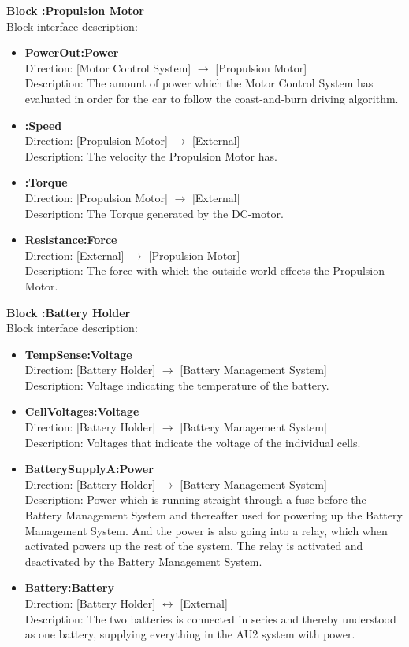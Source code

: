 \textbf{Block :Propulsion Motor}\\
Block interface description:
\begin{itemize}
	\item \textbf{PowerOut:Power}\\
	Direction: [Motor Control System] $\rightarrow$ [Propulsion Motor]\\
	Description: The amount of power which the Motor Control System has evaluated in order for the car to follow the coast-and-burn driving algorithm.
	\item \textbf{:Speed}\\
	Direction: [Propulsion Motor] $\rightarrow$ [External]\\
	Description: The velocity the Propulsion Motor has.
	\item \textbf{:Torque}\\
	Direction: [Propulsion Motor] $\rightarrow$ [External]\\
	Description: The Torque generated by the DC-motor. 
	\item \textbf{Resistance:Force}\\
	Direction: [External] $\rightarrow$ [Propulsion Motor]\\
	Description: The force with which the outside world effects the Propulsion Motor.
\end{itemize}

\textbf{Block :Battery Holder}\\
Block interface description:
\begin{itemize}
	\item \textbf{TempSense:Voltage}\\
	Direction: [Battery Holder] $\rightarrow$ [Battery Management System]\\
	Description: Voltage indicating the temperature of the battery.
	\item \textbf{CellVoltages:Voltage}\\
	Direction: [Battery Holder] $\rightarrow$ [Battery Management System]\\
	Description: Voltages that indicate the voltage of the individual cells.
	\item \textbf{BatterySupplyA:Power}\\
	Direction: [Battery Holder] $\rightarrow$ [Battery Management System]\\
	Description: Power which is running straight through a fuse before the Battery Management System and thereafter used for powering up the Battery Management System. And the power is also going into a relay, which when activated powers up the rest of the system. The relay is activated and deactivated by the Battery Management System.
	\item \textbf{Battery:Battery}\\
	Direction: [Battery Holder] $\leftrightarrow$ [External]\\
	Description: The two batteries is connected in series and thereby understood as one battery, supplying everything in the AU2 system with power.
\end{itemize}